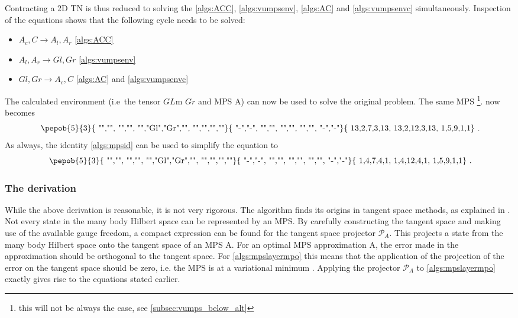 Contracting a 2D \Gls{TN} is thus reduced to solving the  \cref{algs:ACC}, \cref{algs:vumpsenv}, \cref{algs:AC} and \cref{algs:vumpsenvc} simultaneously. Inspection of the equations shows that the following cycle needs to be solved:
\begin{itemize}
    \item  $A_c,C  \rightarrow A_l,A_r  $  \cref{algs:ACC}
    \item  $A_l,A_r  \rightarrow Gl,Gr  $ \cref{algs:vumpsenv}
    \item  $ Gl,Gr   \rightarrow A_c,C $ \cref{algs:AC} and  \cref{algs:vumpsenvc}
\end{itemize}
The calculated environment (i.e\ the tensor $GL$m $Gr$ and \Gls{MPS} A) can now be used to solve the original problem. The same \Gls{MPS}  \footnote{this will not be always the case, see \cref{subsec:vumps_below_alt} }.  now becomes
\begin{equation}\label{vumps_Below}
    \vcenter{ \hbox{   \pepob{5}{3}{{
                        "","", "","",
                        "","Gl","Gr","",
                        "","","",""}}{{
                        "-","-",
                        "","",
                        "","",
                        "","",
                        "-","-"}}{{
                        13,2,7,3,13,
                        13,2,12,3,13,
                        1,5,9,1,1}} }}.
\end{equation}
As always, the identity \eqref{algs:mpsid} can be used to simplify the equation to
\begin{equation}
    \vcenter{ \hbox{   \pepob{5}{3}{{
                        "","", "","",
                        "","Gl","Gr","",
                        "","","",""}}{{
                        "-","-",
                        "","",
                        "","",
                        "","",
                        "-","-"}}{{
                        1,4,7,4,1,
                        1,4,12,4,1,
                        1,5,9,1,1}} }}.
\end{equation}

\subsubsection{The derivation}\label{vumps_Deriv}
While the above derivation is reasonable, it is not very rigorous. The algorithm finds its origins  in tangent space methods, as explained in \cite{Vanderstraeten2019}. Not every state in the many body Hilbert space can be represented by an \Gls{MPS}. By carefully constructing the tangent space and making use of the available gauge freedom, a compact expression can be found for the tangent space projector $\mathcal{P}_A$. This projects a state from the many body Hilbert space onto the tangent space of an \Gls{MPS} A. For an optimal MPS approximation A, the error made in the approximation should be orthogonal to the tangent space. For \cref{algs:mpslayermpo} this means that the application of the projection of the error on the tangent space should be zero, i.e. the \Gls{MPS} is at a variational minimum   \cite{Nietner2020}. Applying the projector $\mathcal{P}_A$ to \cref{algs:mpslayermpo} exactly gives rise to the equations stated earlier.

